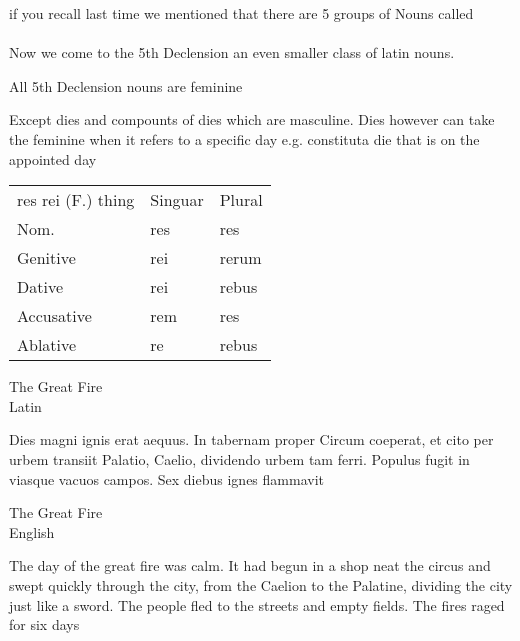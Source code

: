 if you recall last time we mentioned that there are 5 groups
of Nouns called \\\\ 
Now we come to the 5th Declension an even smaller class of
latin nouns. \\ 
\begin{center}  
  All 5th Declension nouns are feminine
\end{center}
Except dies and compounts of dies which are masculine. Dies 
however can take the feminine when it refers to a specific day
e.g. constituta die that is on the appointed day
\begin{center}
  \begin{tabular}{lll}
    res rei (F.) thing& Singuar & Plural \\ 
    Nom. & res & res \\ 
    Genitive & rei & rerum \\ 
    Dative & rei & rebus \\ 
    Accusative & rem  & res \\ 
    Ablative & re & rebus \\
  \end{tabular}
\end{center}
\begin{center}
  \huge The Great Fire \\ Latin
\end{center}
Dies magni ignis erat aequus. In tabernam proper Circum coeperat,
et cito per urbem transiit Palatio, Caelio, dividendo urbem tam 
ferri. Populus fugit in viasque vacuos campos. Sex diebus ignes flammavit 
\begin{center}
  \huge The Great Fire \\ English
\end{center}
The day of the great fire was calm. It had begun in a shop neat the
circus and swept quickly through the city, from the Caelion to the Palatine,
dividing the city just like a sword. The people fled to the 
streets and empty fields. The fires raged for six days 
